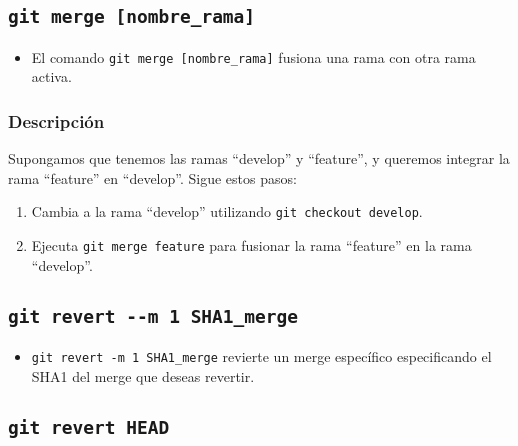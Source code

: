 \documentclass[
  letterpaper,
  DIV=11,
  numbers=noendperiod]{scrartcl}
\providecommand{\tightlist}{%
  \setlength{\itemsep}{0pt}\setlength{\parskip}{0pt}}\usepackage{longtable,booktabs,array}
\begin{document}
\hypertarget{git-merge-nombre_rama}{%
\subsection{\texorpdfstring{\texttt{git\ merge\ {[}nombre\_rama{]}}}{git merge {[}nombre\_rama{]}}}\label{git-merge-nombre_rama}}

\begin{itemize}
\tightlist
\item
  El comando \texttt{git\ merge\ {[}nombre\_rama{]}} fusiona una rama
  con otra rama activa.
\end{itemize}

\hypertarget{descripciuxf3n}{%
\subsubsection{Descripción}\label{descripciuxf3n}}

Supongamos que tenemos las ramas ``develop'' y ``feature'', y queremos
integrar la rama ``feature'' en ``develop''. Sigue estos pasos:

\begin{enumerate}
\def\labelenumi{\arabic{enumi}.}
\tightlist
\item
  Cambia a la rama ``develop'' utilizando
  \texttt{git\ checkout\ develop}.
\item
  Ejecuta \texttt{git\ merge\ feature} para fusionar la rama ``feature''
  en la rama ``develop''.
\end{enumerate}

\hypertarget{git-revert---m-1-sha1_merge}{%
\subsection{\texorpdfstring{\texttt{git\ revert\ -\/-m\ 1\ SHA1\_merge}}{git revert -\/-m 1 SHA1\_merge}}\label{git-revert---m-1-sha1_merge}}

\begin{itemize}
\tightlist
\item
  \texttt{git\ revert\ -m\ 1\ SHA1\_merge} revierte un merge específico
  especificando el SHA1 del merge que deseas revertir.
\end{itemize}

\hypertarget{git-revert-head}{%
\subsection{\texorpdfstring{\texttt{git\ revert\ HEAD}}{git revert HEAD}}\label{git-revert-head}}
\end{document}
